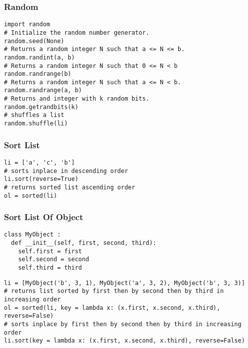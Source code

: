 \documentclass[twoside]{article}
\newcommand{\fileTitleStyle}{\large\underline}
\begin{document}
\begin{multicols*}{2}
\subsubsection*{Random}
\begin{verbatim}
import random
# Initialize the random number generator.
random.seed(None)
# Returns a random integer N such that a <= N <= b.
random.randint(a, b)
# Returns a random integer N such that 0 <= N < b
random.randrange(b)
# Returns a random integer N such that a <= N < b.
random.randrange(a, b)
# Returns and integer with k random bits.
random.getrandbits(k)
# shuffles a list
random.shuffle(li)
\end{verbatim}

\subsubsectionfont{\centering\bfseries\Large}
\subsubsectionfont{\fileTitleStyle}
\subsubsection*{Sort List}
\begin{verbatim}
li = ['a', 'c', 'b']
# sorts inplace in descending order
li.sort(reverse=True)
# returns sorted list ascending order
ol = sorted(li)
\end{verbatim}

\subsubsectionfont{\centering\bfseries\Large}
\subsubsectionfont{\fileTitleStyle}
\subsubsection*{Sort List Of Object}
\begin{verbatim}
class MyObject :
  def __init__(self, first, second, third):
    self.first = first
    self.second = second
    self.third = third
\end{verbatim}
\vspace{-12pt}
\begin{verbatim}
li = [MyObject('b', 3, 1), MyObject('a', 3, 2), MyObject('b', 3, 3)]
# returns list sorted by first then by second then by third in increasing order
ol = sorted(li, key = lambda x: (x.first, x.second, x.third), reverse=False)
# sorts inplace by first then by second then by third in increasing order
li.sort(key = lambda x: (x.first, x.second, x.third), reverse=False)

\end{verbatim}


\end{multicols*}
\end{document}
